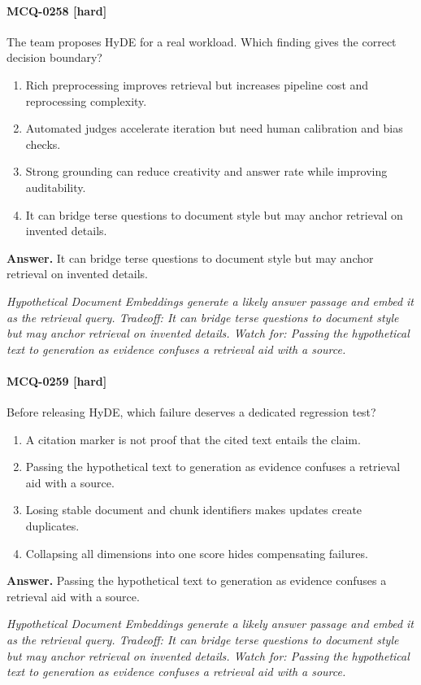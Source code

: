 \paragraph{MCQ-0258 [hard]} The team proposes HyDE for a real workload. Which finding gives the correct decision boundary?
\begin{enumerate}[label=\Alph*.]
\item Rich preprocessing improves retrieval but increases pipeline cost and reprocessing complexity.
\item Automated judges accelerate iteration but need human calibration and bias checks.
\item Strong grounding can reduce creativity and answer rate while improving auditability.
\item It can bridge terse questions to document style but may anchor retrieval on invented details.
\end{enumerate}
\noindent\textbf{Answer.} It can bridge terse questions to document style but may anchor retrieval on invented details.
\par\textit{Hypothetical Document Embeddings generate a likely answer passage and embed it as the retrieval query. Tradeoff: It can bridge terse questions to document style but may anchor retrieval on invented details. Watch for: Passing the hypothetical text to generation as evidence confuses a retrieval aid with a source.}
\paragraph{MCQ-0259 [hard]} Before releasing HyDE, which failure deserves a dedicated regression test?
\begin{enumerate}[label=\Alph*.]
\item A citation marker is not proof that the cited text entails the claim.
\item Passing the hypothetical text to generation as evidence confuses a retrieval aid with a source.
\item Losing stable document and chunk identifiers makes updates create duplicates.
\item Collapsing all dimensions into one score hides compensating failures.
\end{enumerate}
\noindent\textbf{Answer.} Passing the hypothetical text to generation as evidence confuses a retrieval aid with a source.
\par\textit{Hypothetical Document Embeddings generate a likely answer passage and embed it as the retrieval query. Tradeoff: It can bridge terse questions to document style but may anchor retrieval on invented details. Watch for: Passing the hypothetical text to generation as evidence confuses a retrieval aid with a source.}
